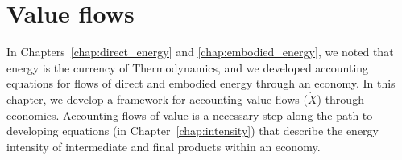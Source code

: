 %
%
%

\chapter{Value flows}
\label{chap:value} %






In Chapters~\ref{chap:direct_energy} and \ref{chap:embodied_energy}, 
we noted that energy is the currency of Thermodynamics,
and we developed accounting equations for flows of 
direct and embodied energy through an economy.
In this chapter, we develop a framework for accounting
value flows ($\dot{X}$) through economies.
Accounting flows of value is a necessary step along
the path to developing equations (in Chapter~\ref{chap:intensity}) 
that describe the energy intensity of intermediate
and final products within an economy.


